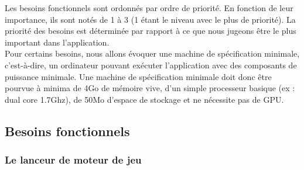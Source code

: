 Les besoins fonctionnels sont ordonnés par ordre de priorité. En fonction de leur importance, ils sont notés de 1 à 3 (1 étant le niveau avec le plus de priorité). La priorité des besoins est déterminée par rapport à ce que nous jugeons être le plus important dans l'application. \\

Pour certains besoins, nous allons évoquer une machine de spécification minimale, c'est-à-dire, un ordinateur pouvant exécuter l'application avec des composants de puissance minimale. Une machine de spécification minimale doit donc être pourvue à minima de 4Go de mémoire vive, d'un simple processeur basique (ex : dual core 1.7Ghz), de 50Mo d'espace de stockage et ne nécessite pas de GPU.

\subsection{Besoins fonctionnels}

\subsubsection{Le lanceur de moteur de jeu}
\label{sec:launcher}

